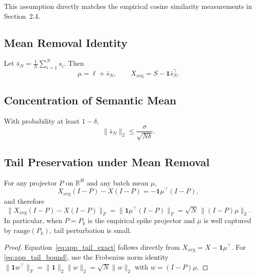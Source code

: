 This assumption directly matches the empirical cosine similarity measurements in
Section~2.4.

\subsection{Mean Removal Identity}

\begin{lemma}
Let $\bar{s}_N = \frac{1}{N}\sum_{i=1}^N s_i$.
Then
\[
\mu = \ell + \bar{s}_N,
\qquad
X_{\mathrm{avg}} = S - \mathbf{1}\bar{s}_N^\top.
\]
\end{lemma}

\subsection{Concentration of Semantic Mean}

\begin{lemma}
With probability at least $1-\delta$,
\[
\|\bar{s}_N\|_2 \le \frac{\sigma}{\sqrt{N\delta}}.
\]
\end{lemma}

\subsection{Tail Preservation under Mean Removal}
\label{app:tail_preservation}

\begin{theorem}
\label{thm:app_tail_additive}
For any projector $P$ on $\mathbb{R}^H$ and any batch mean $\mu$,
\begin{equation}
\label{eq:app_tail_exact}
X_{\mathrm{avg}}(I-P) - X(I-P) = -\mathbf{1}\mu^\top(I-P),
\end{equation}
and therefore
\begin{equation}
\label{eq:app_tail_bound}
\|X_{\mathrm{avg}}(I-P) - X(I-P)\|_F
=
\|\mathbf{1}\mu^\top(I-P)\|_F
=
\sqrt{N}\,\|(I-P)\mu\|_2.
\end{equation}
In particular, when $P=P_k$ is the empirical spike projector and $\mu$ is well
captured by $\mathrm{range}(P_k)$, tail perturbation is small.
\end{theorem}

\begin{proof}
Equation~\eqref{eq:app_tail_exact} follows directly from
$X_{\mathrm{avg}} = X - \mathbf{1}\mu^\top$.
For \eqref{eq:app_tail_bound}, use the Frobenius norm identity
$\|\mathbf{1}w^\top\|_F = \|\mathbf{1}\|_2\|w\|_2 = \sqrt{N}\|w\|_2$ with
$w=(I-P)\mu$.
\end{proof}

